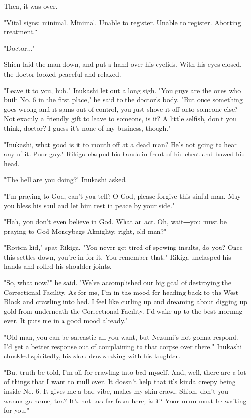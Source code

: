 Then, it was over.

{\sffamily "Vital signs: minimal. Minimal. Unable to register. Unable to register.
Aborting treatment."}

"Doctor..."

Shion laid the man down, and put a hand over his eyelids. With his eyes
closed, the doctor looked peaceful and relaxed.

"Leave it to you, huh." Inukashi let out a long sigh. "You guys are the
ones who built No. 6 in the first place," he said to the doctor's body.
"But once something goes wrong and it spins out of control, you just
shove it off onto someone else? Not exactly a friendly gift to leave to
someone, is it? A little selfish, don't you think, doctor? I guess it's
none of my business, though."

"Inukashi, what good is it to mouth off at a dead man? He's not going to
hear any of it. Poor guy." Rikiga clasped his hands in front of his
chest and bowed his head.

"The hell are you doing?" Inukashi asked.

"I'm praying to God, can't you tell? O God, please forgive this sinful
man. May you bless his soul and let him rest in peace by your side."

"Hah, you don't even believe in God. What an act. Oh, wait―you must be
praying to God Moneybags Almighty, right, old man?"

"Rotten kid," spat Rikiga. "You never get tired of spewing insults, do
you? Once this settles down, you're in for it. You remember that."
Rikiga unclasped his hands and rolled his shoulder joints.

"So, what now?" he said. "We've accomplished our big goal of destroying
the Correctional Facility. As for me, I'm in the mood for heading back
to the West Block and crawling into bed. I feel like curling up and
dreaming about digging up gold from underneath the Correctional
Facility. I'd wake up to the best morning ever. It puts me in a good
mood already."

"Old man, you can be sarcastic all you want, but Nezumi's not gonna
respond. I'd get a better response out of complaining to that corpse
over there." Inukashi chuckled spiritedly, his shoulders shaking with
his laughter.

"But truth be told, I'm all for crawling into bed myself. And, well,
there are a lot of things that I want to mull over. It doesn't help that
it's kinda creepy being inside No. 6. It gives me a bad vibe, makes my
skin crawl. Shion, don't you wanna go home, too? It's not too far from
here, is it? Your mum must be waiting for you."

